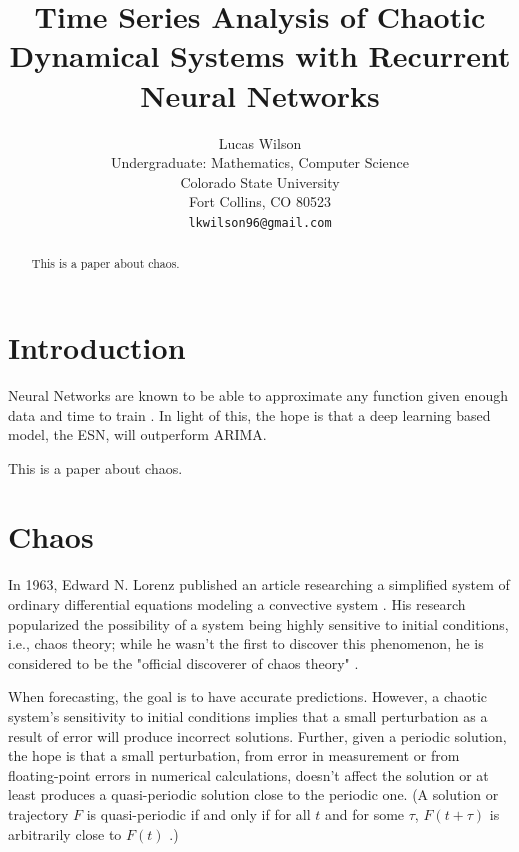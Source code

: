 \documentclass{article}
\title{Time Series Analysis of Chaotic Dynamical Systems with Recurrent Neural Networks}
\author{
  Lucas Wilson \\
  Undergraduate: Mathematics, Computer Science \\
  Colorado State University\\
  Fort Collins, CO 80523 \\
  \texttt{lkwilson96@gmail.com} \\
}
\begin{document}
\maketitle

\begin{abstract}
This is a paper about chaos.
\end{abstract}

\section{Introduction}

Neural Networks are known to be able to approximate any function given 
enough data and time to train \cite{cybenko1989approximation}.
In light of this, the hope is that a deep learning based model,
the ESN, will outperform ARIMA.

This is a paper about chaos.

\section{Chaos}


In 1963, Edward N. Lorenz published an article researching a simplified
system of ordinary differential equations modeling a convective system
\cite{lorenz1963deterministic}. His research popularized the possibility of a
system being highly sensitive to initial conditions, i.e., chaos theory;
while he wasn't the first to discover this phenomenon, he is considered to be
the "official discoverer of chaos theory" \cite{oestreicher2007history}.

When forecasting, the goal is to have accurate predictions. However, a
chaotic system's sensitivity to initial conditions implies that a small
perturbation as a result of error will produce incorrect solutions. Further,
given a periodic solution, the hope is that a small perturbation, from error
in measurement or from floating-point errors in numerical calculations,
doesn't affect the solution or at least produces a quasi-periodic solution
close to the periodic one. (A solution or trajectory $F$ is quasi-periodic if
and only if for all $t$ and for some $\tau$, $F(t+\tau)$ is arbitrarily close
to $F(t)$ \cite{lorenz1963deterministic}.)
\end{document}
